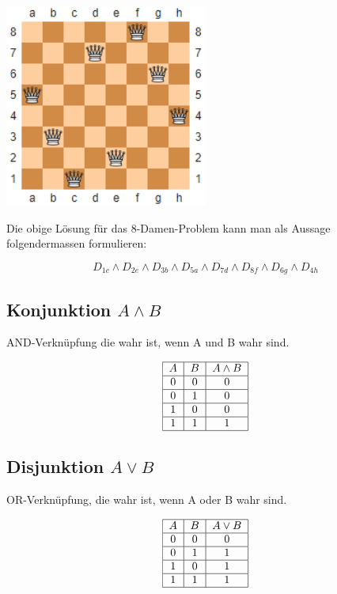 \documentclass[12pt, a4paper, oneside]{article}
\begin{document}
\begin{center}
  \includegraphics[width=0.5\textwidth]{8queens.png}
\end{center}

Die obige Lösung für das 8-Damen-Problem kann man als Aussage folgendermassen formulieren:

\begin{equation*}
  D_{1c} \land D_{2e} \land D_{3b} \land D_{5a} \land D_{7d} \land D_{8f} \land D_{6g} \land D_{4h}
\end{equation*}


\subsection{Konjunktion $A \land B$}
AND-Verknüpfung die wahr ist, wenn A und B wahr sind.

\begin{equation*}
  \begin{tabular}{| c | c | c |}
    \hline
    $A$ & $B$ & $A \land B$ \\ \hline
    0 & 0 & 0 \\ \hline
    0 & 1 & 0 \\ \hline 
    1 & 0 & 0 \\ \hline
    1 & 1 & 1 \\ \hline
  \end{tabular}
\end{equation*}


\subsection{Disjunktion $A \lor B$}
OR-Verknüpfung, die wahr ist, wenn A oder B wahr sind.

\begin{equation*}
  \begin{tabular}{| c | c | c |}
    \hline
    $A$ & $B$ & $A \lor B$ \\ \hline
    0 & 0 & 0 \\ \hline
    0 & 1 & 1 \\ \hline
    1 & 0 & 1 \\ \hline
    1 & 1 & 1 \\ \hline
  \end{tabular}
\end{equation*}
\end{document}
